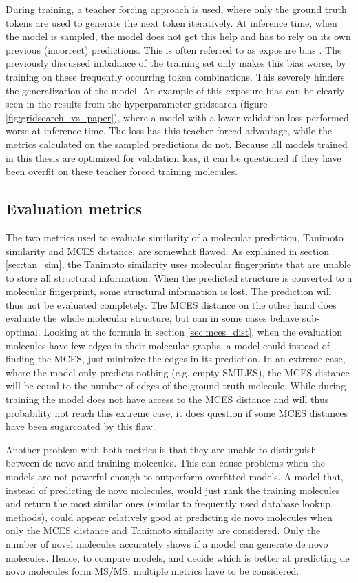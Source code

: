 During training, a teacher forcing approach is used, where only the ground truth tokens are used to generate the next token iteratively.
At inference time, when the model is sampled, the model does not get this help and has to rely on its own previous (incorrect) predictions.
This is often referred to as exposure bias \cite{schmidt2019generalization}.
The previously discussed imbalance of the training set only makes this bias worse, by training on these frequently occurring token combinations.
This severely hinders the generalization of the model.
An example of this exposure bias can be clearly seen in the results from the hyperparameter gridsearch (figure \ref{fig:gridsearch_vs_paper}), where a model with a lower validation loss performed worse at inference time.
The loss has this teacher forced advantage, while the metrics calculated on the sampled predictions do not.
Because all models trained in this thesis are optimized for validation loss, it can be questioned if they have been overfit on these teacher forced training molecules.

\subsection{Evaluation metrics}
The two metrics used to evaluate similarity of a molecular prediction, Tanimoto similarity and \ac{MCES} distance, are somewhat flawed.
As explained in section \ref{sec:tan_sim}, the Tanimoto similarity uses molecular fingerprints that are unable to store all structural information.
When the predicted structure is converted to a molecular fingerprint, some structural information is lost.
The prediction will thus not be evaluated completely.
The \ac{MCES} distance on the other hand does evaluate the whole molecular structure, but can in some cases behave sub-optimal.
Looking at the formula in section \ref{sec:mces_dist}, when the evaluation molecules have few edges in their molecular graphs, a model could instead of finding the \acf{MCES}, just minimize the edges in its prediction.
In an extreme case, where the model only predicts nothing (e.g. empty SMILES), the MCES distance will be equal to the number of edges of the ground-truth molecule.
While during training the model does not have access to the MCES distance and will thus probability not reach this extreme case, it does question if some \ac{MCES} distances have been sugarcoated by this flaw.

Another problem with both metrics is that they are unable to distinguish between de novo and training molecules.
This can cause problems when the models are not powerful enough to outperform overfitted models.
A model that, instead of predicting de novo molecules, would just rank the training molecules and return the most similar ones (similar to frequently used database lookup methods), could appear relatively good at predicting de novo molecules when only the \ac{MCES} distance and Tanimoto similarity are considered.
Only the number of novel molecules accurately shows if a model can generate de novo molecules.
Hence, to compare models, and decide which is better at predicting de novo molecules form \ac{MS/MS}, multiple metrics have to be considered.



